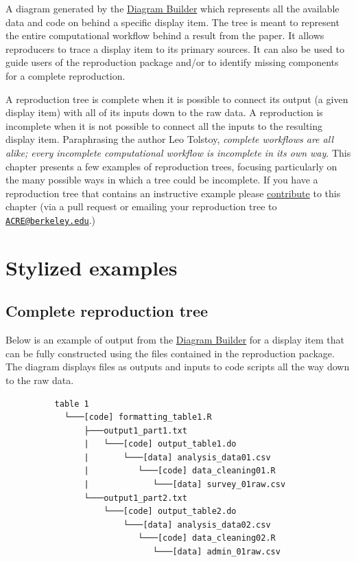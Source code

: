 \documentclass[
  openany]{book}
\begin{document}
A diagram generated by the \protect\hyperlink{diagram}{Diagram Builder} which represents all the available data and code on behind a specific display item. The tree is meant to represent the entire computational workflow behind a result from the paper. It allows reproducers to trace a display item to its primary sources. It can also be used to guide users of the reproduction package and/or to identify missing components for a complete reproduction.

A reproduction tree is complete when it is possible to connect its output (a given display item) with all of its inputs down to the raw data. A reproduction is incomplete when it is not possible to connect all the inputs to the resulting display item. Paraphrasing the author Leo Tolstoy, \emph{complete workflows are all alike; every incomplete computational workflow is incomplete in its own way}. This chapter presents a few examples of reproduction trees, focusing particularly on the many possible ways in which a tree could be incomplete. If you have a reproduction tree that contains an instructive example please \protect\hyperlink{contrib-guide}{contribute} to this chapter (via a pull request or emailing your reproduction tree to \href{mailto:ACRE@berkeley.edu}{\nolinkurl{ACRE@berkeley.edu}}.)

\hypertarget{stylized-examples}{%
\section{Stylized examples}\label{stylized-examples}}

\hypertarget{complete-reproduction-tree}{%
\subsection{Complete reproduction tree}\label{complete-reproduction-tree}}

Below is an example of output from the \protect\hyperlink{diagram}{Diagram Builder} for a display item that can be fully constructed using the files contained in the reproduction package. The diagram displays files as outputs and inputs to code scripts all the way down to the raw data.

\begin{verbatim}
          table 1
            └───[code] formatting_table1.R
                ├───output1_part1.txt  
                |   └───[code] output_table1.do           
                |       └───[data] analysis_data01.csv
                |          └───[code] data_cleaning01.R
                |             └───[data] survey_01raw.csv
                └───output1_part2.txt  
                    └───[code] output_table2.do           
                        └───[data] analysis_data02.csv
                           └───[code] data_cleaning02.R
                              └───[data] admin_01raw.csv  
\end{verbatim}
\end{document}
